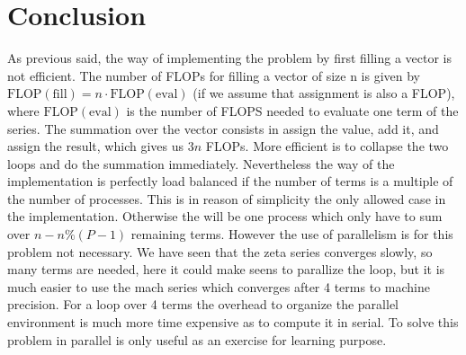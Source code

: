 \section{Conclusion}

As previous said, the way of implementing the problem by first filling a vector is not efficient. The number of FLOPs for filling a vector of size n is given by $\text{FLOP}(\text{fill}) = n \cdot \text{FLOP}(\text{eval})$ (if we assume that assignment is also a FLOP), where $\text{FLOP}(\text{eval})$ is the number of FLOPS needed to evaluate one term of the series. The summation over the vector consists in assign the value, add it, and assign the result, which gives us $3n$ FLOPs. More efficient is to collapse the two loops and do the summation immediately. Nevertheless the way of the implementation is perfectly load balanced if the number of terms is a multiple of the number of processes. This is in reason of simplicity the only allowed case in the implementation. Otherwise the will be one process which only have to sum over $n - n \% (P-1)$ remaining terms. However the use of parallelism is for this problem not necessary. We have seen that the zeta series converges slowly, so many terms are needed, here it could make seens to parallize the loop, but it is much easier to use the mach series which converges after 4 terms to machine precision. For a loop over 4 terms the overhead to organize the parallel environment is much more time expensive as to compute it in serial. To solve this problem in parallel is only useful as an exercise for learning purpose. 





